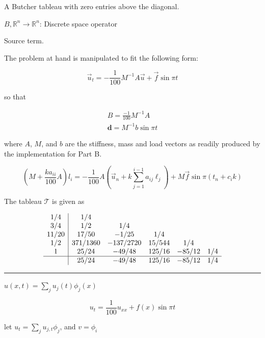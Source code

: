 \documentclass[
  11pt,
]{article}
\providecommand{\tightlist}{%
  \setlength{\itemsep}{0pt}\setlength{\parskip}{0pt}}
\begin{document}
\begin{description}
\tightlist
\item[\(\mathcal{T}\)]
A Butcher tableau with zero entries above the diagonal.
\end{description}

\(B, \mathbb{R}^n \rightarrow \mathbb{R}^n\): Discrete space operator

\begin{description}
\tightlist
\item[\(\mathbf{d}, \mathbb{R} \rightarrow \mathbb{R}^n\)]
Source term.
\end{description}

The problem at hand is manipulated to fit the following form:

\[\vec{u}_{t}=-\frac{1}{100} {M}^{-1} A \vec{u}+\vec{f} \sin \pi t\]

so that

\[
\begin{gathered}
B=\frac{-1}{100}M^{-1}A \\
\mathbf{d}=M^{-1}b\sin{\pi t}
\end{gathered}
\]

where \(A\), \(M\), and \(b\) are the stiffness, mass and load vectors
as readily produced by the implementation for Part B.

\[
\left(M+\frac{k a_{i i}}{100} A\right) l_{i} = -\frac{1}{100} A\left(\vec{u}_{n}+k \sum_{j=1}^{i-1} a_{i j} \ell_{j}\right) + M \vec{f} \sin \pi\left(t_{n}+c_{i} k\right)
\]

The tableau \(\mathcal{T}\) is given as

\[
\begin{array}{c|ccccc}
  1/4 & 1/4 \\
  3/4 & 1/2 & 1/4 \\
  11/20 & 17/50 & -1/25 & 1/4 \\
  1/2 & 371/1360 & -137/2720 & 15/544 & 1/4 \\
  1 & 25/24 & -49/48 & 125/16 & -85/12 & 1/4 \\
  \hline
  & 25/24 & -49/48 & 125/16 & -85/12 & 1/4
\end{array}
\]

\begin{center}\rule{0.5\linewidth}{0.5pt}\end{center}

\(u(x,t) = \sum_j u_j(t)\phi_j(x)\)

\[u_{t}=\frac{1}{100} u_{x x}+f(x) \sin \pi t\]

let \(u_t = \sum_ju_{j,t}\phi_j\), and \(v=\phi_i\)
\end{document}
